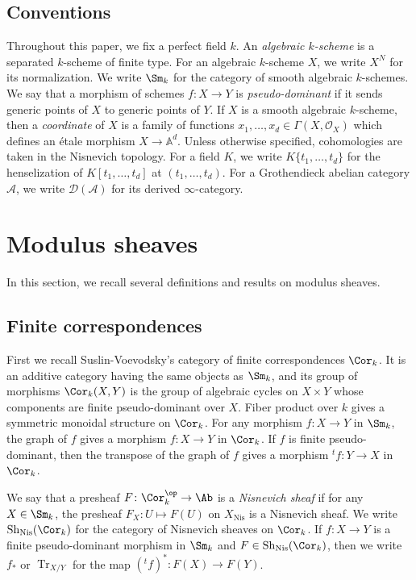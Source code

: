 \documentclass{amsart}
\theoremstyle{plain}
\theoremstyle{definition}
\theoremstyle{remark}
\numberwithin{equation}{section}
\DeclareMathOperator{\Sh}{Sh}
\DeclareMathOperator{\Tr}{Tr}
\def\Nis{\mathrm{Nis}}
\begin{document}
\subsection*{Conventions}
Throughout this paper, we fix a perfect field $k$.
An \emph{algebraic $k$-scheme} is a separated $k$-scheme of finite type.
For an algebraic $k$-scheme $X$, we write $X^N$ for its normalization.
We write $\Sm_k$ for the category of smooth algebraic $k$-schemes.
We say that a morphism of schemes $f\colon X\to Y$ is \emph{pseudo-dominant} if it sends generic points of $X$ to generic points of $Y$.
If $X$ is a smooth algebraic $k$-scheme, then a \emph{coordinate} of $X$ is a family of functions $x_1,\dots,x_d\in \Gamma(X,\mathcal{O}_X)$ which defines an \'etale morphism $X\to \mathbb{A}^d$.
Unless otherwise specified, cohomologies are taken in the Nisnevich topology.
For a field $K$, we write $K\{t_1,\dots,t_d\}$ for the henselization of $K[t_1,\dots,t_d]$ at $(t_1,\dots,t_d)$.
For a Grothendieck abelian category $\mathcal{A}$, we write $\mathcal{D}(\mathcal{A})$ for its derived $\infty$-category.


\section{Modulus sheaves}

In this section, we recall several definitions and results on modulus sheaves.

\subsection{Finite correspondences}

First we recall Suslin-Voevodsky's category of finite correspondences $\Cor_k$.
It is an additive category having the same objects as $\Sm_k$, and its group of morphisms $\Cor_k(X,Y)$ is the group of algebraic cycles on $X\times Y$ whose components are finite pseudo-dominant over $X$.
Fiber product over $k$ gives a symmetric monoidal structure on $\Cor_k$.
For any morphism $f\colon X\to Y$ in $\Sm_k$, the graph of $f$ gives a morphism $f\colon X\to Y$ in $\Cor_k$.
If $f$ is finite pseudo-dominant, then the transpose of the graph of $f$ gives a morphism ${}^tf\colon Y\to X$ in $\Cor_k$.

We say that a presheaf $F\colon \Cor_k^\op\to \Ab$ is a \emph{Nisnevich sheaf} if for any $X\in \Sm_k$, the presheaf $F_X\colon U\mapsto F(U)$ on $X_\Nis$ is a Nisnevich sheaf.
We write $\Sh_\Nis(\Cor_k)$ for the category of Nisnevich sheaves on $\Cor_k$.
If $f\colon X\to Y$ is a finite pseudo-dominant morphism in $\Sm_k$ and $F\in \Sh_\Nis(\Cor_k)$, then we write $f_*$ or $\Tr_{X/Y}$ for the map $({}^tf)^*\colon F(X)\to F(Y)$.
\end{document}
